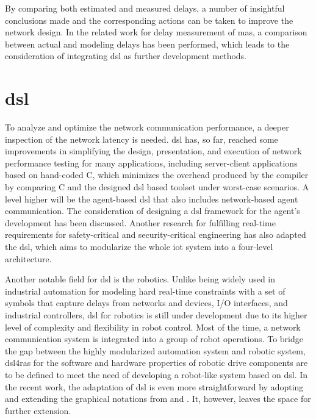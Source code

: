 By comparing both estimated and measured delays, a number of insightful 
conclusions made and the corresponding actions can be taken to improve 
the network design.
In the related work for delay measurement of \gls{mas}, 
a comparison between actual and modeling 
delays has been performed\cite{vogel-heuser_delay_2023}, which leads to the 
consideration of integrating \gls{dsl} as further development methods.





\section{\gls{dsl}}
To analyze and optimize the network communication performance, a deeper 
inspection of the network latency is needed. \gls{dsl} has, so far, reached 
some improvements in simplifying the design, presentation, and execution of 
network performance testing for many applications, including server-client applications 
based on hand-coded C, which minimizes the overhead produced by the compiler by 
comparing C and the designed \gls{dsl} based toolset under worst-case scenarios.
A level higher will be the agent-based \gls{dsl} that also includes network-based 
agent communication. The consideration of designing a \gls{dsl} framework 
for the agent's development has been discussed\cite{judith_domain_2013}. Another 
research for fulfilling real-time requirements for safety-critical and 
security-critical engineering has also adapted the \gls{dsl}, which aims to 
modularize the whole \gls{iot} system into a four-level architecture\cite{sklyar_domain_2022}. 



Another notable field for \gls{dsl} is the robotics. Unlike being widely 
used in industrial automation for modeling hard real-time constraints with 
a set of symbols that capture delays from networks and devices, I/O interfaces, 
and industrial controllers\cite{hujo_toward_2022}, \gls{dsl} for robotics is still 
under development due to its higher level of complexity and flexibility in 
robot control. Most of the time, a network communication system is integrated into a group 
of robot operations. To bridge the gap between the highly modularized automation system 
and robotic system, \gls{dsl4ras} for the software and hardware 
properties of robotic drive components are to be defined to meet the need 
of developing a robot-like system based on \gls{dsl}. In the recent work\cite{vogel-heuser_delay_2023}, 
the adaptation of \gls{dsl} is even more straightforward by adopting and 
extending the graphical notations 
from \cite{hujo_toward_2022} and \cite{volpert_supporting_nodate}. It, however, 
leaves the space for further extension. 



